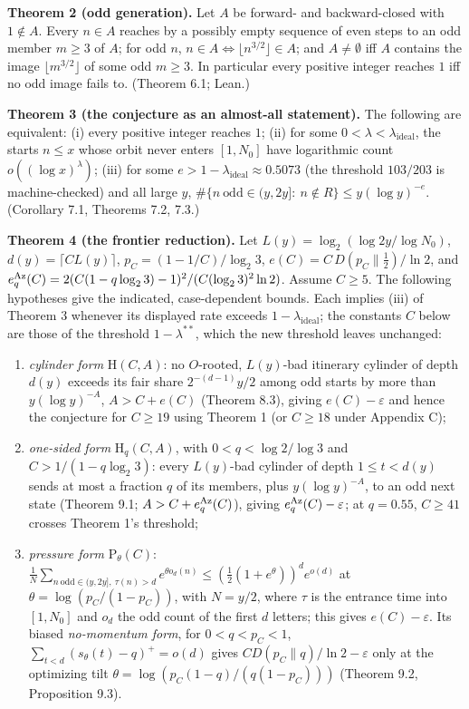 \documentclass[11pt,a4paper]{article}
\begin{document}
\textbf{Theorem 2 (odd generation).} Let \(A\) be forward- and
backward-closed with \(1\notin A\). Every \(n\in A\) reaches by a
possibly empty sequence of even steps to an odd member \(m\ge 3\) of
\(A\); for odd \(n\), \(n\in A\iff\lfloor n^{3/2}\rfloor\in A\); and
\(A\ne\emptyset\) iff \(A\) contains the image
\(\lfloor m^{3/2}\rfloor\) of some odd \(m\ge 3\). In particular every
positive integer reaches \(1\) iff no odd image fails to. (Theorem 6.1;
Lean.)

\textbf{Theorem 3 (the conjecture as an almost-all statement).} The
following are equivalent: (i) every positive integer reaches \(1\); (ii)
for some \(0<\lambda<\lambda_{\mathrm{ideal}}\), the starts \(n\le x\)
whose orbit never enters \([1,N_0]\) have logarithmic count
\(o((\log x)^{\lambda})\); (iii) for some
\(e>1-\lambda_{\mathrm{ideal}}\approx0.5073\) (the threshold \(103/203\)
is machine-checked) and all large \(y\),
\(\#\{n\ \text{odd}\in(y,2y]:\ n\notin R\}\le y(\log y)^{-e}\).
(Corollary 7.1, Theorems 7.2, 7.3.)

\textbf{Theorem 4 (the frontier reduction).} Let
\(L(y)=\log_2(\log 2y/\log N_0)\), \(d(y)=\lceil CL(y)\rceil\),
\(p_C=(1-1/C)/\log_2 3\), \(e(C)=C\,D(p_C\|\tfrac12)/\ln 2\), and
\(e_q^{\rm Az}(C)=2(C(1-q\log_2 3)-1)^2/
(C(\log_2 3)^2\ln2)\). Assume \(C\ge5\). The following hypotheses give
the indicated, case-dependent bounds. Each implies (iii) of Theorem 3
whenever its displayed rate exceeds \(1-\lambda_{\mathrm{ideal}}\); the
constants \(C\) below are those of the threshold \(1-\lambda^{**}\),
which the new threshold leaves unchanged:

\begin{enumerate}
\def\labelenumi{(\alph{enumi})}
\item
  \emph{cylinder form} \(\mathrm H(C,A)\): no \(O\)-rooted, \(L(y)\)-bad
  itinerary cylinder of depth \(d(y)\) exceeds its fair share
  \(2^{-(d-1)}y/2\) among odd starts by more than \(y(\log y)^{-A}\),
  \(A>C+e(C)\) (Theorem 8.3), giving \(e(C)-\varepsilon\) and hence the
  conjecture for \(C\ge19\) using Theorem 1 (or \(C\ge18\) under
  Appendix C);
\item
  \emph{one-sided form} \(\mathrm H_q(C,A)\), with \(0<q<\log 2/\log 3\)
  and \(C>1/(1-q\log_2 3)\): every \(L(y)\)-bad cylinder of depth
  \(1\le t<d(y)\) sends at most a fraction \(q\) of its members, plus
  \(y(\log y)^{-A}\), to an odd next state (Theorem 9.1;
  \(A>C+e_q^{\rm Az}(C)\)), giving \(e_q^{\rm Az}(C)-\varepsilon\); at
  \(q=0.55\), \(C\ge41\) crosses Theorem 1's threshold;
\item
  \emph{pressure form} \(\mathrm P_\theta(C)\):
  \(\frac1N\sum_{n\ \mathrm{odd}\in(y,2y],\ \tau(n)>d}e^{\theta o_d(n)}\le(\tfrac12(1+e^{\theta}))^{d}e^{o(d)}\)
  at \(\theta=\log(p_C/(1-p_C))\), with \(N=y/2\), where \(\tau\) is the
  entrance time into \([1,N_0]\) and \(o_d\) the odd count of the first
  \(d\) letters; this gives \(e(C)-\varepsilon\). Its biased
  \emph{no-momentum form}, for \(0<q<p_C<1\),
  \(\sum_{t<d}(s_\theta(t)-q)^+=o(d)\) gives
  \(C D(p_C\|q)/\ln2-\varepsilon\) only at the optimizing tilt
  \(\theta=\log(p_C(1-q)/(q(1-p_C)))\) (Theorem 9.2, Proposition 9.3).
\end{enumerate}
\end{document}
